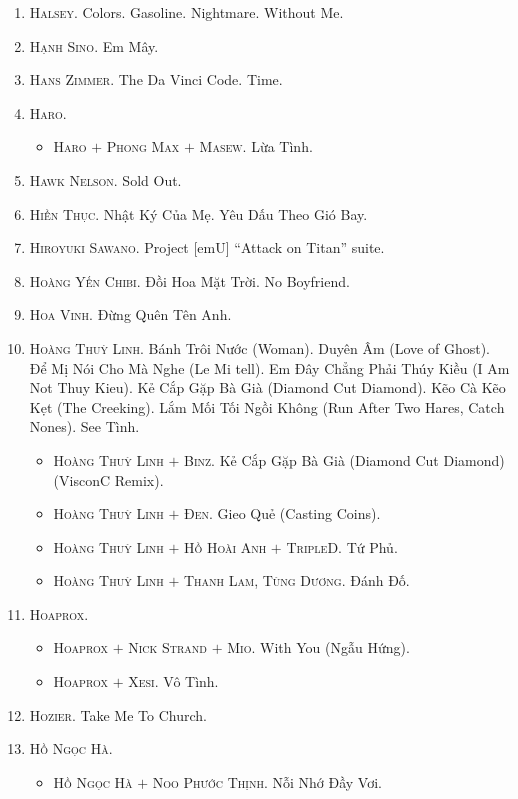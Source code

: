 \documentclass[oneside]{book}
\numberwithin{equation}{section}
\begin{document}
\begin{enumerate}
	\item \textsc{Halsey.} Colors. Gasoline. Nightmare. Without Me.
	\item \textsc{Hạnh Sino.} Em Mây.
	\item \textsc{Hans Zimmer.} The Da Vinci Code. Time.
	\item \textsc{Haro.}
	\begin{itemize}
		\item \textsc{Haro $+$ Phong Max $+$ Masew.} Lừa Tình.
	\end{itemize}
	\item \textsc{Hawk Nelson.} Sold Out.
	\item \textsc{Hiền Thục.} Nhật Ký Của Mẹ. Yêu Dấu Theo Gió Bay.
	\item \textsc{Hiroyuki Sawano.} Project [emU] ``Attack on Titan'' suite.
	\item \textsc{Hoàng Yến Chibi.} Đồi Hoa Mặt Trời. No Boyfriend.
	\item \textsc{Hoa Vinh.} Đừng Quên Tên Anh.
	\item \textsc{Hoàng Thuỳ Linh.} Bánh Trôi Nước (Woman). Duyên Âm (Love of Ghost). Để Mị Nói Cho Mà Nghe (Le Mi tell). Em Đây Chẳng Phải Thúy Kiều (I Am Not Thuy Kieu). Kẻ Cắp Gặp Bà Già (Diamond Cut Diamond). Kẽo Cà Kẽo Kẹt (The Creeking). Lắm Mối Tối Ngồi Không (Run After Two Hares, Catch Nones). See Tình.
	\begin{itemize}
		\item \textsc{Hoàng Thuỳ Linh $+$ Binz.} Kẻ Cắp Gặp Bà Già (Diamond Cut Diamond) (VisconC Remix). 
		\item \textsc{Hoàng Thuỳ Linh $+$ Đen.} Gieo Quẻ (Casting Coins).
		\item \textsc{Hoàng Thuỳ Linh $+$ Hồ Hoài Anh $+$ TripleD.} Tứ Phủ.
		\item \textsc{Hoàng Thuỳ Linh $+$ Thanh Lam, Tùng Dương.} Đánh Đố.
	\end{itemize}
	\item \textsc{Hoaprox.}
	\begin{itemize}
		\item \textsc{Hoaprox $+$ Nick Strand $+$ Mio.} With You (Ngẫu Hứng).
		\item \textsc{Hoaprox $+$ Xesi.} Vô Tình.
	\end{itemize}
	\item \textsc{Hozier.} Take Me To Church.
	\item \textsc{Hồ Ngọc Hà.}
	\begin{itemize}
		\item \textsc{Hồ Ngọc Hà $+$ Noo Phước Thịnh.} Nỗi Nhớ Đầy Vơi.

\end{itemize}
\end{enumerate}
\end{document}
